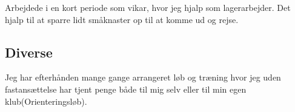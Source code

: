 \documentclass[11pt,a4paper,sans]{moderncv} %
\begin{document}
Arbejdede i en kort periode som vikar, hvor jeg hjalp som lagerarbejder. Det hjalp til at sparre lidt sm\aa knaster op til at komme ud og rejse. 
%
%



%
\subsection{Diverse}

Jeg har efterh\aa nden mange gange arrangeret l\o b og tr\ae ning hvor jeg uden fastans\ae ttelse har tjent penge både til mig selv eller til min egen klub(Orienteringsl\o b).
\end{document}

